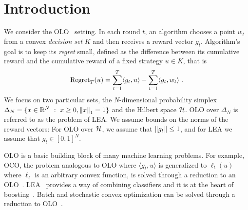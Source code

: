 \section{Introduction}
\label{section:introduction}

We consider the \ac{OLO}~\cite{Cesa-Bianchi-Lugosi-2006, Shalev-Shwartz-2011}
setting. In each round $t$, an algorithm chooses a point $w_t$ from a convex
\emph{decision set} $K$ and then receives a reward vector $g_t$. Algorithm's
goal is to keep its \emph{regret} small, defined as the difference between its
cumulative reward and the cumulative reward of a fixed strategy $u \in K$, that
is
\vspace{-.1cm}
\[
\operatorname{Regret}_T(u) = \sum_{t=1}^T \langle g_t, u \rangle - \sum_{t=1}^T \langle g_t, w_t \rangle \; .
\]
We focus on two particular sets, the $N$-dimensional probability simplex
$\Delta_N = \{ x \in \mathbb{R}^N ~:~ x \ge 0, \left\|{x}\right\|_1 = 1\}$ and the Hilbert space
$\mathcal{H}$.  \ac{OLO} over $\Delta_N$ is referred to as the problem of \ac{LEA}.  We
assume bounds on the norms of the reward vectors: For \ac{OLO} over $\mathcal{H}$, we
assume that $\left\|{g_t}\right\| \le 1$, and for \ac{LEA} we assume that $g_t \in
[0,1]^N$.

\ac{OLO} is a basic building block of many machine learning problems. For
example, \ac{OCO}, the problem analogous to \ac{OLO} where $\langle g_t, u
\rangle$ is generalized to $\ell_t(u)$ where $\ell_t$ is an arbitrary convex
function, is solved through a reduction to an
\ac{OLO}~\cite{Shalev-Shwartz-2011}.  \ac{LEA}~\cite{Littlestone-Warmuth-1994,
Vovk-1998, Cesa-Bianchi-Freund-Haussler-Helmbold-Schapire-Warmuth-1997}
provides a way of combining classifiers and it is at the heart of
boosting~\cite{Freund-Schapire-1997}. Batch and stochastic convex optimization
can be solved through a reduction to \ac{OLO}~\cite{Shalev-Shwartz-2011}.

